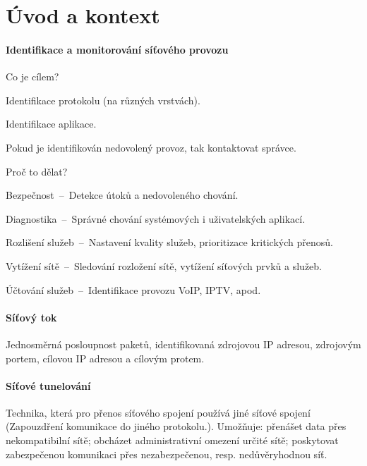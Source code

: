 
\section{Úvod a kontext}

\paragraph*{Identifikace a monitorování síťového provozu} \begin{compactitem}
    \item Co je cílem? \begin{compactitem}
        \item Identifikace protokolu (na různých vrstvách).
        \item Identifikace aplikace.
        \item Pokud je identifikován nedovolený provoz, tak kontaktovat správce.
    \end{compactitem}
    \item Proč to dělat? \begin{compactitem}
        \item Bezpečnost~--~Detekce útoků a nedovoleného chování.
        \item Diagnostika~--~Správné chování systémových i uživatelských aplikací.
        \item Rozlišení služeb~--~Nastavení kvality služeb, prioritizace kritických přenosů.
        \item Vytížení sítě~--~Sledování rozložení sítě, vytížení síťových prvků a služeb.
        \item Účtování služeb~--~Identifikace provozu VoIP, IPTV, apod.
    \end{compactitem}
\end{compactitem}

\paragraph*{Síťový tok} Jednosměrná posloupnost paketů, identifikovaná zdrojovou IP adresou, zdrojovým portem, cílovou IP adresou a cílovým protem.

\paragraph*{Síťové tunelování} Technika, která pro přenos síťového spojení používá jiné síťové spojení (Zapouzdření komunikace do jiného protokolu.). Umožňuje: přenášet data přes nekompatibilní sítě; obcházet administrativní omezení určité sítě; poskytovat zabezpečenou komunikaci přes nezabezpečenou, resp. nedůvěryhodnou síť.

